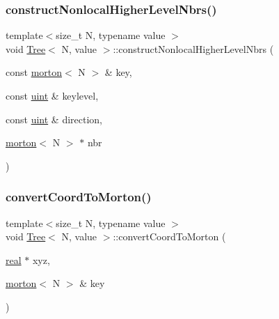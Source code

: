 \mbox{\label{classTree_ab93adb07d37664f0e359eb8ea9cf56d1}} 
\subsubsection{\texorpdfstring{construct\+Nonlocal\+Higher\+Level\+Nbrs()}{constructNonlocalHigherLevelNbrs()}}
{\footnotesize\ttfamily template$<$size\+\_\+t N, typename value $>$ \\
void \mbox{\hyperlink{classTree}{Tree}}$<$ N, value $>$\+::construct\+Nonlocal\+Higher\+Level\+Nbrs (\begin{DoxyParamCaption}\item[{const \mbox{\hyperlink{definitions_8h_af8682350bd8bb38ee9023f7a0a310add}{morton}}$<$ N $>$ \&}]{key,  }\item[{const \mbox{\hyperlink{definitions_8h_a69aa29b598b851b0640aa225a9e5d61d}{uint}} \&}]{keylevel,  }\item[{const \mbox{\hyperlink{definitions_8h_a69aa29b598b851b0640aa225a9e5d61d}{uint}} \&}]{direction,  }\item[{\mbox{\hyperlink{definitions_8h_af8682350bd8bb38ee9023f7a0a310add}{morton}}$<$ N $>$ $\ast$}]{nbr }\end{DoxyParamCaption})}

\mbox{\label{classTree_a945d137d27bb55d9feb5762ac821572a}} 
\subsubsection{\texorpdfstring{convert\+Coord\+To\+Morton()}{convertCoordToMorton()}}
{\footnotesize\ttfamily template$<$size\+\_\+t N, typename value $>$ \\
void \mbox{\hyperlink{classTree}{Tree}}$<$ N, value $>$\+::convert\+Coord\+To\+Morton (\begin{DoxyParamCaption}\item[{\mbox{\hyperlink{definitions_8h_aedc0ad84d1e764530814f57ad931d02a}{real}} $\ast$}]{xyz,  }\item[{\mbox{\hyperlink{definitions_8h_af8682350bd8bb38ee9023f7a0a310add}{morton}}$<$ N $>$ \&}]{key }\end{DoxyParamCaption})\hspace{0.3cm}{\ttfamily [virtual]}}

